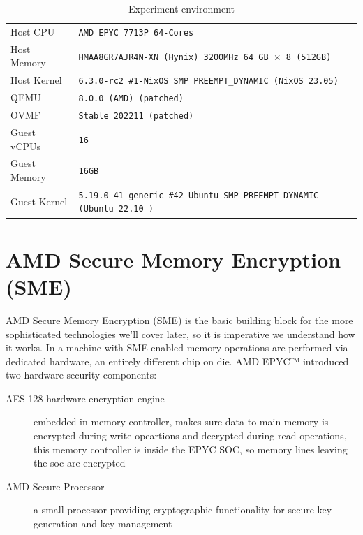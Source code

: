 \documentclass[twocolumn]{article}
\begin{document}
\begin{table}
    \centering
    \label{tab:experiment-environment}
    \begin{tabular}{l|l}
        \hline
        Host CPU      & \texttt{AMD EPYC 7713P 64-Cores}                                            \\
        Host Memory   & \texttt{HMAA8GR7AJR4N-XN (Hynix) 3200MHz 64 GB $\times$ 8 (512GB)}          \\
        Host Kernel   & \texttt{6.3.0-rc2 \#1-NixOS SMP PREEMPT\_DYNAMIC (NixOS 23.05)}             \\
        QEMU          & \texttt{8.0.0 (AMD) (patched)}                                              \\
        OVMF          & \texttt{Stable 202211 (patched)}                                            \\
        Guest vCPUs   & \texttt{16}                                                                 \\
        Guest Memory  & \texttt{16GB}                                                               \\
        Guest Kernel  & \texttt{5.19.0-41-generic \#42-Ubuntu SMP PREEMPT\_DYNAMIC (Ubuntu 22.10 )} \\ 
        \hline
    \end{tabular}
    \caption{Experiment environment}
\end{table}

\section{AMD Secure Memory Encryption (SME)}
    AMD Secure Memory Encryption (SME) is the basic building block for the more sophisticated technologies we'll cover later, so it is imperative we understand how it works. In a machine with SME enabled memory operations are performed via dedicated hardware, an entirely different chip on die. AMD EPYC™ introduced two hardware security components:
    \begin{description}
        \item [AES-128 hardware encryption engine] embedded in memory controller, makes sure data to main memory is encrypted during write opeartions and decrypted during read operations, this memory controller is inside the EPYC SOC, so memory lines leaving the soc are encrypted
        \item [AMD Secure Processor] a small processor providing cryptographic functionality for secure key generation and key management
    \end{description}
\end{document}
